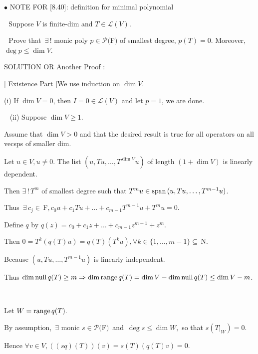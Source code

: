 \documentclass[a4paper, 11pt, UTF8]{article}
\def\range{\textup{range}\,}
\def\null{\textup{null\,}}
\def\Spn{\textup{span}\,}
\def\Lm{\mathcal{L}}
\def\Po{\mathcal{P}}
\def\Fbfc{$\,{\timesbf F}$}
\def\Nbfc{$\,{\timesbf N}$}
\begin{document}
\begin{large}
{\small $\bullet$} {\timesbf\Large N{\normalsize OTE} F{\normalsize OR} [8.40]:} {\timessl\normalsize definition for minimal polynomial }\par\,\,
{\timessl\Large Suppose $V$ is finite-dim and $T \in \Lm(V)$.}\par\,\,
{\timessl\Large Prove that $\,\exists\,!$ monic poly $p \in \Po(${\timesbf F}$)$ of smallest degree, $p(T) = 0$. Moreover, $\deg p\leq \dim V$.}\par
{\timesbf S\footnotesize{OLUTION}} O{\small R} Another Proof\,\,{\timesbf:}\par\quad
{\Large[} {\timessl\large Existence Part} {\Large]}\quad We use induction on $\dim V.$\par\quad
(i) If $\dim V = 0$, then $I=0\in\Lm(V)$ and let $p=1$, we are done.\par\,\,\,
(ii) Suppose $\dim V\geq 1.$\par\qquad
{\timessl Assume that $\dim V > 0$ and that the desired result is true for all operators on all vecsps of smaller dim.}\par\qquad
Let $u\in V,u\neq 0$. The list $(u, Tu, \dots, T^{\dim V} u)$ of length $(1 + \dim V)$ is linearly dependent.\par\qquad
Then $\exists\,!\,T^{m}$ of smallest degree such that $T^m u\in\Spn(u, Tu, \dots, T^{m-1} u)$.\par\qquad
Thus $\,\exists\,c_j\in\Fbfc,c_0 u + c_1 Tu +\dots + c_{m-1} T^{m-1} u + T^m u = 0$.\par\qquad
Define $q$ by
$q(z) = c_0 + c_1 z + \dots + c_{m-1} z^{m-1} + z^m$.\par\qquad Then $0=T^k(q(T)u)=q(T)(T^k u),\forall k\in\{1,\dots,m-1\}\subseteq\Nbfc.$\par\qquad
Because $(u, Tu, \dots , T^{m-1} u)$ is linearly independent.\par\qquad
Thus $\dim\null q(T) \geq m\Rightarrow\dim \range q(T) = \dim V - \dim \null q(T) \leq \dim V - m$.\par{\tiny\,\par}\qquad
Let $W=\range q(T).$\par\qquad
By {\timessl assumption}, $\,\exists$ monic $s\in\Po(${\timesbf F}$)$ \,{\small and}\, $\deg s\leq\dim W,$ so that $s(T|_W ) = 0$.\par\qquad
Hence $\forall v\in V,((sq)(T))(v) = s(T)(q(T)v) = 0.$\par\qquad

\end{large}
\end{document}
